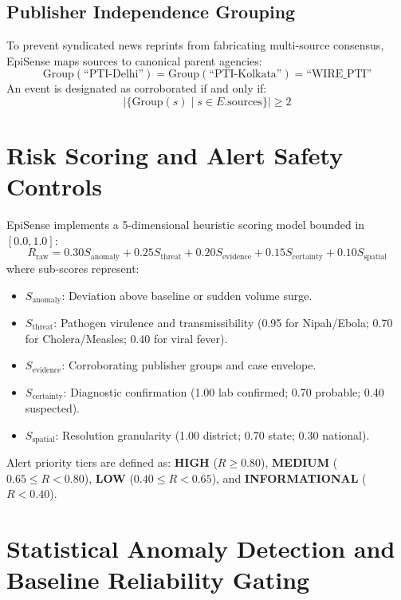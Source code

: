 \documentclass[conference]{IEEEtran}
\begin{document}
\subsection{Publisher Independence Grouping}
To prevent syndicated news reprints from fabricating multi-source consensus, EpiSense maps sources to canonical parent agencies:
\begin{equation}
\text{Group}(\text{``PTI-Delhi''}) = \text{Group}(\text{``PTI-Kolkata''}) = \text{``WIRE\_PTI''}
\end{equation}
An event is designated as corroborated if and only if:
\begin{equation}
|\{\text{Group}(s) \mid s \in E.\text{sources}\}| \ge 2
\end{equation}

\section{Risk Scoring and Alert Safety Controls}
EpiSense implements a 5-dimensional heuristic scoring model bounded in $[0.0, 1.0]$:
\begin{equation}
R_{\text{raw}} = 0.30 S_{\text{anomaly}} + 0.25 S_{\text{threat}} + 0.20 S_{\text{evidence}} + 0.15 S_{\text{certainty}} + 0.10 S_{\text{spatial}}
\end{equation}
where sub-scores represent:
\begin{itemize}
    \item $S_{\text{anomaly}}$: Deviation above baseline or sudden volume surge.
    \item $S_{\text{threat}}$: Pathogen virulence and transmissibility (0.95 for Nipah/Ebola; 0.70 for Cholera/Measles; 0.40 for viral fever).
    \item $S_{\text{evidence}}$: Corroborating publisher groups and case envelope.
    \item $S_{\text{certainty}}$: Diagnostic confirmation (1.00 lab confirmed; 0.70 probable; 0.40 suspected).
    \item $S_{\text{spatial}}$: Resolution granularity (1.00 district; 0.70 state; 0.30 national).
\end{itemize}

Alert priority tiers are defined as: \textbf{HIGH} ($R \ge 0.80$), \textbf{MEDIUM} ($0.65 \le R < 0.80$), \textbf{LOW} ($0.40 \le R < 0.65$), and \textbf{INFORMATIONAL} ($R < 0.40$).

\section{Statistical Anomaly Detection and Baseline Reliability Gating}
\end{document}
